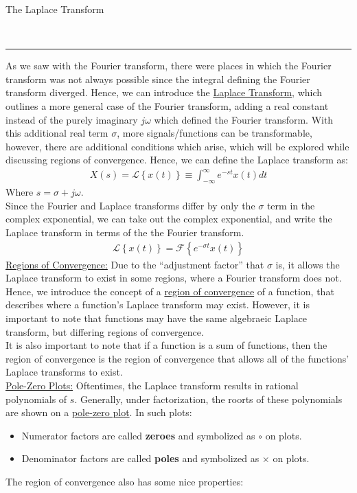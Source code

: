 \documentclass{article}
\newcommand{\sheader}[1]{\underline{#1:}}
\newcommand{\curly}[1]{\left\{#1\right\}}
\newcommand{\header}[1]{\begin{large}\noindent #1\end{large}\\\rule{\textwidth}{0.5pt}}
\newcommand{\gap}{\medskip\\}
\newcommand{\jomega}{{j\omega}}
\newcommand{\Laplace}{\mathscr{L}}
\newcommand{\Fourier}{\mathcal{F}}
\begin{document}
\header{The Laplace Transform}
As we saw with the Fourier transform, there were places in which the Fourier transform 
was not always possible since the integral defining the Fourier transform diverged. 
Hence, we can introduce the \underline{Laplace Transform}, which outlines a more general 
case of the Fourier transform, adding a real constant instead of the purely imaginary 
$\jomega$ which defined the Fourier transform. With this additional real term $\sigma$,
more signals/functions can be transformable, however, there are additional conditions 
which arise, which will be explored while discussing regions of convergence. Hence,
we can define the Laplace transform as:
\begin{align*}
    X(s) = \Laplace\curly{x(t)}  \equiv \int_{-\infty}^\infty e^{-st}x(t)dt
\end{align*}
Where $s = \sigma + \jomega$.
\gap
Since the Fourier and Laplace transforms differ by only the $\sigma$ term in the 
complex exponential, we can take out the complex exponential, and write the Laplace
transform in terms of the the Fourier transform.
\begin{align*}
    \Laplace\curly{x(t)} = \Fourier\curly{e^{-\sigma t} x(t)}
\end{align*}
\sheader{Regions of Convergence} Due to the ``adjustment factor'' that $\sigma$ is, it allows the Laplace transform to 
exist in some regions, where a Fourier transform does not. Hence, we introduce the concept 
of a \underline{region of convergence} of a function, that describes where a function's 
Laplace transform may exist. However, it is important to note that functions may have the 
same algebraeic Laplace transform, but differing regions of convergence. 
\gap
It is also important to note that if a function is a sum of functions, then the region 
of convergence is the region of convergence that allows all of the functions' Laplace 
transforms to exist.
\gap
\sheader{Pole-Zero Plots} Oftentimes, the Laplace transform results in rational 
polynomials of $s$. Generally, under factorization, the roorts of these polynomials are 
shown on a \underline{pole-zero plot}. In such plots:
\begin{itemize}
    \item Numerator factors are called \textbf{zeroes} and symbolized as $\circ$ on plots.
    \item Denominator factors are called \textbf{poles} and symbolized as $\times$ on plots.
\end{itemize}
The region of convergence also has some nice properties:
\end{document}
